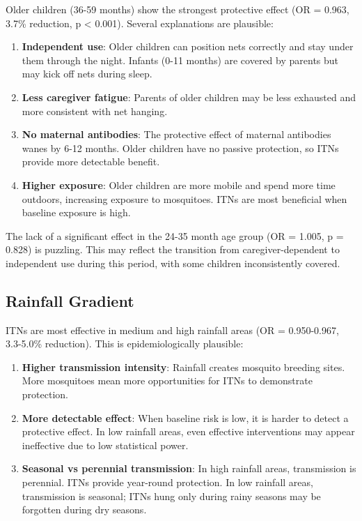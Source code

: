 Older children (36-59 months) show the strongest protective effect (OR = 0.963, 3.7\% reduction, p < 0.001). Several explanations are plausible:

\begin{enumerate}
	\item \textbf{Independent use}: Older children can position nets correctly and stay under them through the night. Infants (0-11 months) are covered by parents but may kick off nets during sleep.
	
	\item \textbf{Less caregiver fatigue}: Parents of older children may be less exhausted and more consistent with net hanging.
	
	\item \textbf{No maternal antibodies}: The protective effect of maternal antibodies wanes by 6-12 months. Older children have no passive protection, so ITNs provide more detectable benefit.
	
	\item \textbf{Higher exposure}: Older children are more mobile and spend more time outdoors, increasing exposure to mosquitoes. ITNs are most beneficial when baseline exposure is high.
\end{enumerate}

The lack of a significant effect in the 24-35 month age group (OR = 1.005, p = 0.828) is puzzling. This may reflect the transition from caregiver-dependent to independent use during this period, with some children inconsistently covered.

\subsection{Rainfall Gradient}

ITNs are most effective in medium and high rainfall areas (OR = 0.950-0.967, 3.3-5.0\% reduction). This is epidemiologically plausible:

\begin{enumerate}
	\item \textbf{Higher transmission intensity}: Rainfall creates mosquito breeding sites. More mosquitoes mean more opportunities for ITNs to demonstrate protection.
	
	\item \textbf{More detectable effect}: When baseline risk is low, it is harder to detect a protective effect. In low rainfall areas, even effective interventions may appear ineffective due to low statistical power.
	
	\item \textbf{Seasonal vs perennial transmission}: In high rainfall areas, transmission is perennial. ITNs provide year-round protection. In low rainfall areas, transmission is seasonal; ITNs hung only during rainy seasons may be forgotten during dry seasons.
\end{enumerate}

